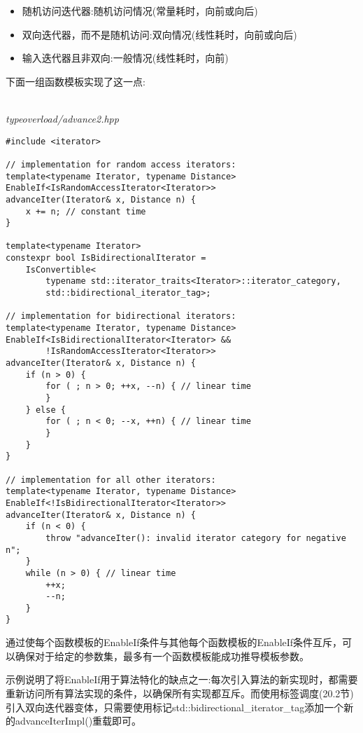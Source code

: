 \begin{itemize}
\item 
随机访问迭代器:随机访问情况(常量耗时，向前或向后)

\item
双向迭代器，而不是随机访问:双向情况(线性耗时，向前或向后)

\item
输入迭代器且非双向:一般情况(线性耗时，向前)
\end{itemize}

下面一组函数模板实现了这一点:

\hspace*{\fill} \\ %
\noindent
\textit{typeoverload/advance2.hpp}
\begin{lstlisting}[style=styleCXX]
#include <iterator>

// implementation for random access iterators:
template<typename Iterator, typename Distance>
EnableIf<IsRandomAccessIterator<Iterator>>
advanceIter(Iterator& x, Distance n) {
	x += n; // constant time
}

template<typename Iterator>
constexpr bool IsBidirectionalIterator =
	IsConvertible<
		typename std::iterator_traits<Iterator>::iterator_category,
		std::bidirectional_iterator_tag>;

// implementation for bidirectional iterators:
template<typename Iterator, typename Distance>
EnableIf<IsBidirectionalIterator<Iterator> &&
		!IsRandomAccessIterator<Iterator>>
advanceIter(Iterator& x, Distance n) {
	if (n > 0) {
		for ( ; n > 0; ++x, --n) { // linear time
		}
	} else {
		for ( ; n < 0; --x, ++n) { // linear time
		}
	}
}

// implementation for all other iterators:
template<typename Iterator, typename Distance>
EnableIf<!IsBidirectionalIterator<Iterator>>
advanceIter(Iterator& x, Distance n) {
	if (n < 0) {
		throw "advanceIter(): invalid iterator category for negative n";
	}
	while (n > 0) { // linear time
		++x;
		--n;
	}
}
\end{lstlisting}

通过使每个函数模板的EnableIf条件与其他每个函数模板的EnableIf条件互斥，可以确保对于给定的参数集，最多有一个函数模板能成功推导模板参数。

示例说明了将EnableIf用于算法特化的缺点之一:每次引入算法的新实现时，都需要重新访问所有算法实现的条件，以确保所有实现都互斥。而使用标签调度(20.2节)引入双向迭代器变体，只需要使用标记std::bidirectional\_iterator\_tag添加一个新的advanceIterImpl()重载即可。

